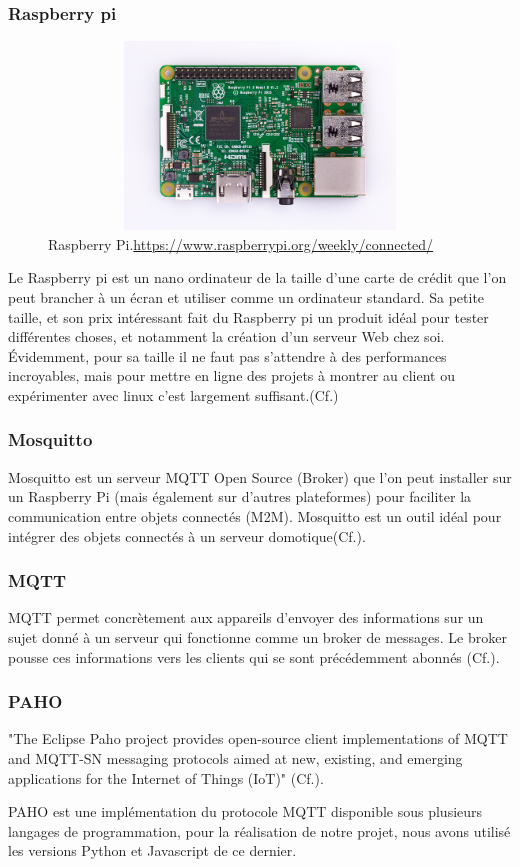 \documentclass[12pt,a4paper]{article}
\begin{document}
\subsubsection*{Raspberry pi }
\par
\begin{figure}[ht]
\centering
\includegraphics[width = 12cm,height=5cm]{rasberry.jpg}
 \caption {Raspberry Pi.\href{url}{https://www.raspberrypi.org/weekly/connected/}} 
	\label{label-raspberry}
\end{figure}
Le Raspberry pi est un nano ordinateur de la taille d'une carte de crédit que l'on peut brancher à un écran et utiliser comme un ordinateur standard. Sa petite taille, et son prix intéressant fait du Raspberry pi un produit idéal pour tester différentes choses, et notamment la création d'un serveur Web chez soi. Évidemment, pour sa taille il ne faut pas s'attendre à des performances incroyables, mais pour mettre en ligne des projets à montrer au client ou expérimenter avec linux c'est largement suffisant.(Cf.\cite{Ref20})
\subsubsection*{Mosquitto}
Mosquitto est un serveur MQTT Open Source (Broker) que l’on peut installer sur un Raspberry Pi (mais également sur d’autres plateformes) pour faciliter la communication entre objets connectés (M2M). Mosquitto est un outil idéal pour intégrer des objets connectés à un serveur domotique(Cf.\cite{ref29}).
\subsubsection*{MQTT}
MQTT permet concrètement aux appareils d'envoyer des informations sur un sujet donné à un serveur qui fonctionne comme un broker de messages. Le broker pousse ces informations vers les clients qui se sont précédemment abonnés (Cf.\cite{Ref21}).

\subsubsection*{PAHO}
"The Eclipse Paho project provides open-source client implementations of MQTT and MQTT-SN messaging protocols aimed at new, existing, and emerging applications for the Internet of Things (IoT)" (Cf.\cite{Ref28}).\par
PAHO est une implémentation du protocole MQTT disponible sous plusieurs langages de programmation, pour la réalisation de notre projet, nous avons utilisé les versions Python et Javascript de ce dernier.
\end{document}
